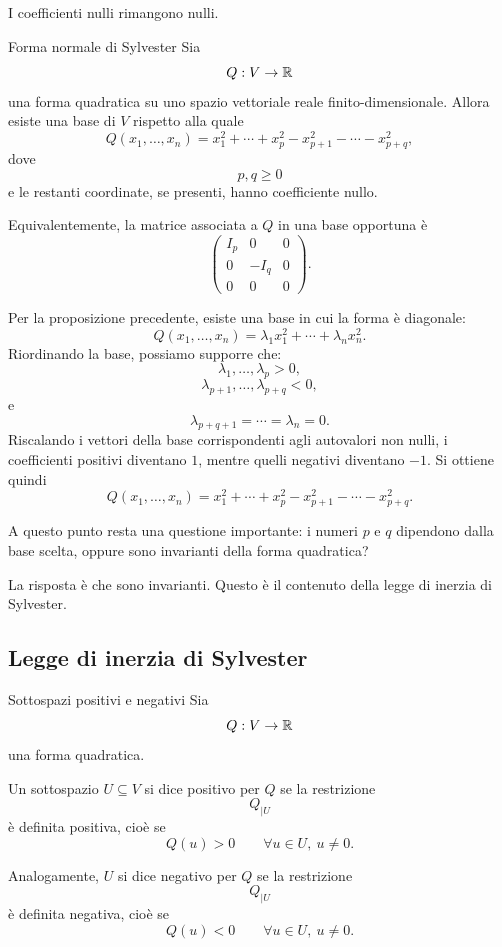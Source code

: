 \documentclass[a4paper]{article}
\begin{document}
I coefficienti nulli rimangono nulli.

\begin{snippettheorem}{Forma normale di Sylvester}
    Sia
    \[
        Q:V\to\mathbb{R}
    \]
    una forma quadratica su uno spazio vettoriale reale finito-dimensionale. Allora esiste una base di \(V\) rispetto alla quale
    \[
        Q(x_1,\ldots,x_n)
        =
        x_1^2+\cdots+x_p^2
        -
        x_{p+1}^2-\cdots-x_{p+q}^2,
    \]
    dove
    \[
        p,q\geq 0
    \]
    e le restanti coordinate, se presenti, hanno coefficiente nullo.

    Equivalentemente, la matrice associata a \(Q\) in una base opportuna è
    \[
        \begin{pmatrix}
            I_p & 0 & 0\\
            0 & -I_q & 0\\
            0 & 0 & 0
        \end{pmatrix}.
    \]
\end{snippettheorem}

\begin{snippetproof}{}
    Per la proposizione precedente, esiste una base in cui la forma è diagonale:
    \[
        Q(x_1,\ldots,x_n)=\lambda_1x_1^2+\cdots+\lambda_nx_n^2.
    \]
    Riordinando la base, possiamo supporre che:
    \[
        \lambda_1,\ldots,\lambda_p>0,
    \]
    \[
        \lambda_{p+1},\ldots,\lambda_{p+q}<0,
    \]
    e
    \[
        \lambda_{p+q+1}=\cdots=\lambda_n=0.
    \]
    Riscalando i vettori della base corrispondenti agli autovalori non nulli, i coefficienti positivi diventano \(1\), mentre quelli negativi diventano \(-1\). Si ottiene quindi
    \[
        Q(x_1,\ldots,x_n)
        =
        x_1^2+\cdots+x_p^2
        -
        x_{p+1}^2-\cdots-x_{p+q}^2.
    \]
\end{snippetproof}

A questo punto resta una questione importante: i numeri \(p\) e \(q\) dipendono dalla base scelta, oppure sono invarianti della forma quadratica?

La risposta è che sono invarianti. Questo è il contenuto della legge di inerzia di Sylvester.

\subsection{Legge di inerzia di Sylvester}

\begin{snippetdefinition}{Sottospazi positivi e negativi}
    Sia
    \[
        Q:V\to\mathbb{R}
    \]
    una forma quadratica.

    Un sottospazio \(U\subseteq V\) si dice positivo per \(Q\) se la restrizione
    \[
        Q_{\mid U}
    \]
    è definita positiva, cioè se
    \[
        Q(u)>0
        \qquad
        \forall u\in U,\ u\neq 0.
    \]

    Analogamente, \(U\) si dice negativo per \(Q\) se la restrizione
    \[
        Q_{\mid U}
    \]
    è definita negativa, cioè se
    \[
        Q(u)<0
        \qquad
        \forall u\in U,\ u\neq 0.
    \]
\end{snippetdefinition}
\end{document}
